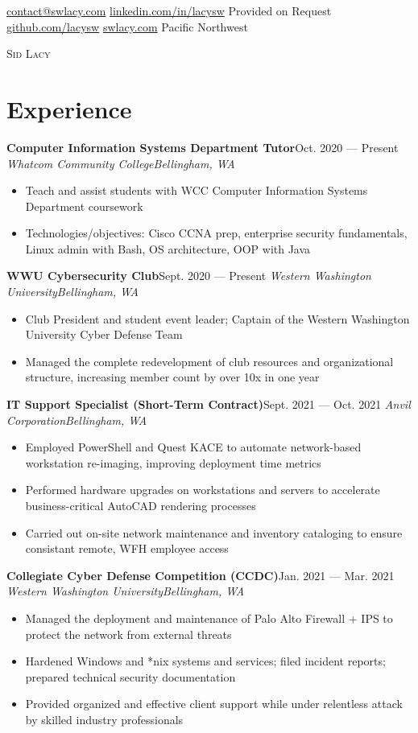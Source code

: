 \documentclass{article}
\newcommand{\alignicon}[2][nmbr]{\eqmakebox[#1]{\strut #2}}
\newcommand{\topLevelItem}[5]{
    \textbf{#1}\hfill #4 — #5\newline
    \emph{#2\hfill #3}\newline
    \vspace{-18pt}\begin{itemize}
}
\newcommand{\topLevelItemEnd}{\end{itemize}\vspace{5pt}}
\newcommand{\lowLevelItem}[1]{
    \item\small{#1}\vspace{-8pt}
}
\begin{document}
    \begin{center}
        \noindent\alignicon\faEnvelope\quad\href{mailto:contact@swlacy.com}{contact@swlacy.com}\hfill %
        \href{https://linkedin.com/in/lacysw}{linkedin.com/in/lacysw}\quad\alignicon\faLinkedin\newline %
        \alignicon\faPhone\quad Provided on Request\hfill %
        \href{https://github.com/lacysw}{github.com/lacysw}\quad\alignicon\faGithub\newline %
        \alignicon\faGlobe\quad\href{https://swlacy.com}{swlacy.com}\hfill %
        Pacific Northwest\quad\alignicon\faMapMarker\vspace*{-0.37in} %
        
        {\fontsize{32}{0}\selectfont\scshape Sid Lacy} %
    \end{center}
    
    \section*{Experience}
        \topLevelItem{Computer Information Systems Department Tutor}{Whatcom Community College}{Bellingham, WA}{Oct. 2020}{Present}
            \lowLevelItem{Teach and assist students with WCC Computer Information Systems Department coursework}
            \lowLevelItem{Technologies/objectives: Cisco CCNA prep, enterprise security fundamentals, Linux admin with Bash, OS architecture, OOP with Java}
        \topLevelItemEnd
        \topLevelItem{WWU Cybersecurity Club}{Western Washington University}{Bellingham, WA}{Sept. 2020}{Present}
            \lowLevelItem{Club President and student event leader; Captain of the Western Washington University Cyber Defense Team}
            \lowLevelItem{Managed the complete redevelopment of club resources and organizational structure, increasing member count by over 10x in one year}
        \topLevelItemEnd
        \topLevelItem{IT Support Specialist (Short-Term Contract)}{Anvil Corporation}{Bellingham, WA}{Sept. 2021}{Oct. 2021}
            \lowLevelItem{Employed PowerShell and Quest KACE to automate network-based workstation re-imaging, improving deployment time metrics}
            \lowLevelItem{Performed hardware upgrades on workstations and servers to accelerate business-critical AutoCAD rendering processes}
            \lowLevelItem{Carried out on-site network maintenance and inventory cataloging to ensure consistant remote, WFH employee access}
        \topLevelItemEnd
        \topLevelItem{Collegiate Cyber Defense Competition (CCDC)}{Western Washington University}{Bellingham, WA}{Jan. 2021}{Mar. 2021}
            \lowLevelItem{Managed the deployment and maintenance of Palo Alto Firewall + IPS to protect the network from external threats}
            \lowLevelItem{Hardened Windows and *nix systems and services; filed incident reports; prepared technical security documentation}
            \lowLevelItem{Provided organized and effective client support while under relentless attack by skilled industry professionals}
        \topLevelItemEnd
        
\end{document}
